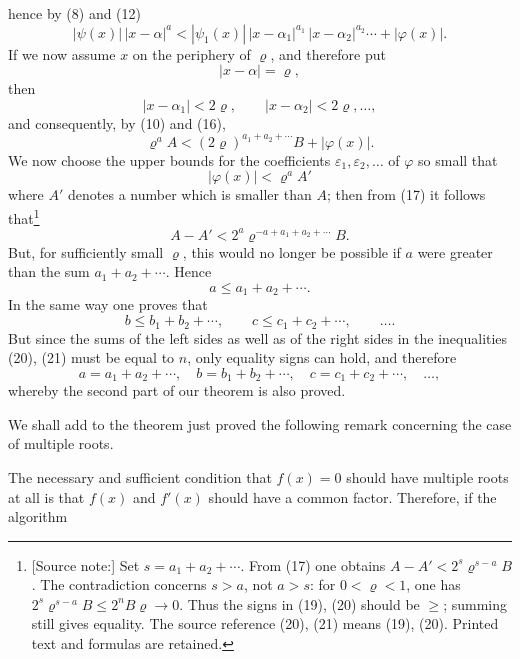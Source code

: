 
hence by (8) and (12)
\begin{equation}
 |\psi(x)|\,|x-\alpha|^a<|\psi_1(x)|\,|x-\alpha_1|^{a_1}\,|x-\alpha_2|^{a_2}\cdots+|\varphi(x)|.
\tag{16}
\end{equation}
If we now assume $x$ on the periphery of $\varrho$, and therefore put
\[
 |x-\alpha|=\varrho,
\]
then
\[
 |x-\alpha_1|<2\varrho,\qquad |x-\alpha_2|<2\varrho,\ldots,
\]
and consequently, by (10) and (16),
\begin{equation}
 \varrho^a A < (2\varrho)^{a_1+a_2+\cdots}B+|\varphi(x)|.
\tag{17}
\end{equation}
We now choose the upper bounds for the coefficients $\varepsilon_1,\varepsilon_2,
\ldots$ of $\varphi$ so small that
\[
 |\varphi(x)|<\varrho^aA'
\]
where $A'$ denotes a number which is smaller than $A$; then from (17) it follows that\begingroup\renewcommand{\thefootnote}{E1}\footnote[1]{[Source note:] Set $s=a_1+a_2+\cdots$. From (17) one obtains $A-A'<2^s\varrho^{s-a}B$. The contradiction concerns $s>a$, not $a>s$: for $0<\varrho<1$, one has $2^s\varrho^{s-a}B\le 2^nB\varrho\to0$. Thus the signs in (19), (20) should be $\ge$; summing still gives equality. The source reference (20), (21) means (19), (20). Printed text and formulas are retained.}\endgroup
\begin{equation}
 A-A'<2^{a}\varrho^{-a+a_1+a_2+\cdots}B.
\tag{18}
\end{equation}
But, for sufficiently small $\varrho$, this would no longer be possible if $a$ were greater than the sum $a_1+a_2+\cdots$. Hence
\begin{equation}
 a\le a_1+a_2+\cdots .
\tag{19}
\end{equation}
In the same way one proves that
\begin{equation}
 b\le b_1+b_2+\cdots,
 \qquad
 c\le c_1+c_2+\cdots,
 \qquad \ldots .
\tag{20}
\end{equation}
But since the sums of the left sides as well as of the right sides in the inequalities (20), (21) must be equal to $n$,
only equality signs can hold, and therefore
\[
 a=a_1+a_2+\cdots,
 \quad b=b_1+b_2+\cdots,
 \quad c=c_1+c_2+\cdots,
 \quad \ldots,
\]
whereby the second part of our theorem is also proved.

We shall add to the theorem just proved the following remark concerning the case of multiple roots.

The necessary and sufficient condition that $f(x)=0$ should have multiple roots at all is that $f(x)$ and $f'(x)$ should have a common factor. Therefore, if the algorithm
